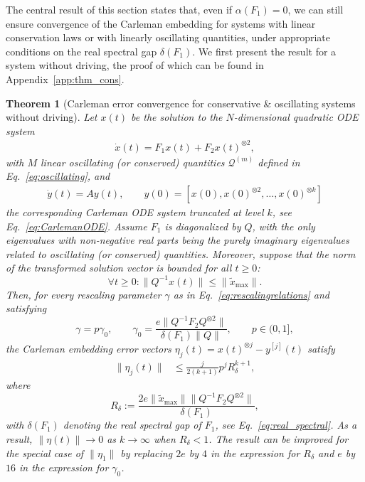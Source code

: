 \documentclass[superscriptaddress,onecolumn,nofootinbib,longbibliography,a4paper,accepted=2026-09-29]{quantumarticle}
\theoremstyle{plain}
\newtheorem{thm}{Theorem}
\theoremstyle{definition}
\numberwithin{thm}{section}
\numberwithin{assumption}{section}
\numberwithin{lemma}{section}
\numberwithin{prop}{section}
\numberwithin{cor}{section}
\numberwithin{definition}{section}
\numberwithin{rmk}{section}
\numberwithin{equation}{section}
\newcommand\Q{ {\mathcal Q} }
\begin{document}
The central result of this section states that, even if $\alpha(F_1)=0$, we can still ensure convergence of the Carleman embedding for systems with linear conservation laws or with linearly oscillating quantities, under appropriate conditions on the real spectral gap $\delta(F_1)$. We first present the result for a system without driving, the proof of which can be found in Appendix~\ref{app:thm_cons}.
\begin{thm}[Carleman error convergence for conservative \& oscillating systems without driving]
    \label{thm:Carleman_cons}
    Let $x(t)$ be the solution to the $N$-dimensional quadratic ODE system
    \begin{align}
    \dot{x}(t) = F_1 x(t)+ F_2x(t)^{\otimes 2},
    \end{align}
    with $M$ linear oscillating (or conserved) quantities $\Q^{(m)}$ defined in Eq.~\eqref{eq:oscillating}, and 
    \begin{align}
        \dot{y}(t) = Ay(t), \quad \quad y(0) = [x(0), x(0)^{\otimes 2}, \dots, x(0)^{\otimes k}]
    \end{align}
    the corresponding Carleman ODE system truncated at level $k$, see Eq.~\eqref{eq:CarlemanODE}. Assume $F_1$ is diagonalized by $Q$, with the only eigenvalues with non-negative real parts being the purely imaginary eigenvalues related to oscillating (or conserved) quantities. Moreover, suppose that the norm of the transformed solution vector is bounded for all $t \ge 0$:
    \begin{equation}
        \forall t \ge 0: \|Q^{-1} x(t)\| \leq \|\tilde{x}_{\mathrm{max}}\|.
    \end{equation}
    Then, for every rescaling parameter $\gamma$ as in Eq.~\eqref{eq:rescalingrelations} and satisfying
    \begin{equation}
        \gamma = p \gamma_0,\qquad \gamma_0=\frac{e\|Q^{-1}F_2Q^{\otimes 2}\|}{\delta(F_1)\|Q\|},\qquad p\in(0,1],
    \end{equation}
    the Carleman embedding error vectors $\eta_j(t) = x(t)^{\otimes j} - y^{[j]}(t)$ satisfy
    \begin{align}
        \|\eta_j(t)\| &\leq \frac{j}{2(k+1)}p^j R_\delta^{k+1},
    \end{align}
    where
    \begin{equation}\label{eq:R-number-conservative}
        R_\delta := \frac{2e\|\tilde{x}_{\mathrm{max}}\|\|Q^{-1}F_2Q^{\otimes 2}\|}{\delta(F_1)},
    \end{equation}
    with $\delta(F_1)$ denoting the real spectral gap of $F_1$, see Eq.~\eqref{eq:real_spectral}. As a result, $\|\eta(t)\|\to 0$ as $k\to\infty$ when $R_\delta<1$. The result can be improved for the special case of $\|\eta_1\|$ by replacing $2e$ by $4$ in the expression for $R_\delta$ and $e$ by $16$ in the expression for $\gamma_0$. 
\end{thm}
\end{document}
